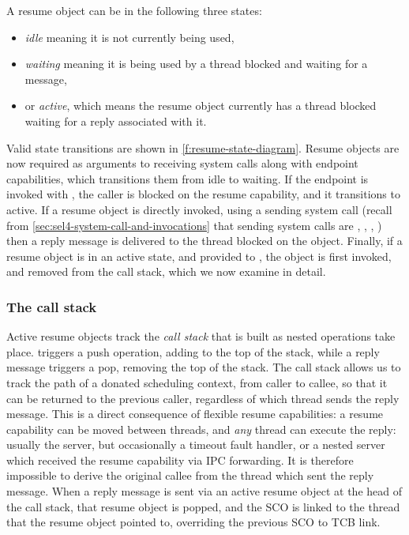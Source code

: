 A resume object can be in the following three states:
\begin{itemize}
    \item \emph{idle} meaning it is not currently being used,
    \item \emph{waiting} meaning it is being used by a thread blocked and waiting for a message, 
    \item or \emph{active}, which means the resume object currently has a thread blocked waiting for a reply associated with it.
\end{itemize}
Valid state transitions are shown in \cref{f:resume-state-diagram}. Resume objects are now required
as arguments  to
receiving system calls along with endpoint capabilities, which transitions them from idle to
waiting.
If the endpoint is invoked with \call, the caller is blocked on the resume capability, and
it transitions to active.  
If a resume object is directly invoked, using a sending system call (recall from
\cref{sec:sel4-system-call-and-invocations} that sending system calls are \send,
\nbsend, \call, \reply) then a reply message is delivered to the thread blocked on
the object. Finally, if a resume object is in an active state, and provided to \recv, the object
is first invoked, and removed from the call stack, which we now examine in detail. 


\subsubsection{The call stack}

Active resume objects track the \emph{call stack} that is built as nested \call operations take
place. \call triggers a push operation, adding to the top of the stack, while a reply message
triggers a
pop, removing the top of the stack.  The call stack allows us to track the path of a donated
scheduling context, from caller to callee, so that it can be returned to the previous caller,
regardless of which thread sends the reply message. This is a direct consequence of flexible resume
capabilities:  a resume capability can be moved between threads, and \emph{any} thread can execute the
reply: usually the server, but occasionally a timeout fault handler, or a nested server which
received the resume capability via \gls{IPC} forwarding. It is therefore impossible to derive the
original callee from the thread which sent the reply message. When a reply message is sent via an 
active resume object at the head of the call stack, that resume object is popped, and the \gls{SCO} is
linked to the thread that the resume object pointed to, overriding the previous \gls{SCO} to
\gls{TCB} link.

